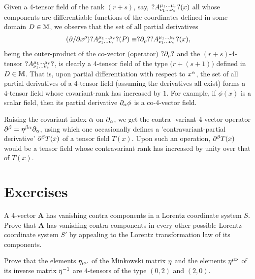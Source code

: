 Given a 4-tensor field of the rank 
$(r+s)$,  say, $?A^{{{\mu}_1}\dots {\ensuremath{{\mu}}_r}}_{{{\nu}_1}\dots 
{\ensuremath{{\nu}}_s}}?(x)$ all whose components are differentiable 
functions of the coordinates  defined in some domain $D\in 
\mathbb{M}$, we observe that the set of all partial derivatives
\begin{align*}
({\partial}/{\partial} 
x^{{\rho}})?A^{{{\mu}_1}\dots {\ensuremath{{\mu}}_r}}_{{{\nu}_1}\dots 
{\ensuremath{{\nu}}_s}}?(P)\equiv?{\partial}_{{\rho}}??A^{{{\mu}_1}\dots 
{\ensuremath{{\mu}}_r}}_{{{\nu}_1}\dots {\ensuremath{{\nu}}_s}}?(x),                     
\end{align*}
 being the outer-product of the co-vector (operator) 
$?{\partial}_{{\rho}}?$ and the $(r+s)$-4-tensor $?A^{{{\mu}_1}\dots 
{\ensuremath{{\mu}}_r}}_{{{\nu}_1}\dots {\ensuremath{{\nu}}_s}}?$,  is clearly a 4-tensor 
field of the type $\big(r+(s+1)\big)$ defined in $D\in 
\mathbb{M}$. That is, upon partial differentiation with respect 
to $x^{{\alpha}}$, the set of all partial derivatives of a 
4-tensor field (assuming the derivatives all exist) forms a 
4-tensor field whose covariant-rank has increased by $1$. 
For example, if $\phi(x)$ is a scalar field, then its 
partial derivative ${\partial}_{{\alpha}} \phi$  is a co-4-vector field.

Raising the covariant index ${\alpha}$ on ${\partial}_{{\alpha}}$, we get 
the contra  -variant-4-vector operator 
${\partial}^{{\beta}}={\eta}^{{\beta}{\alpha}}{\partial}_{{\alpha}}$, using which one 
occasionally defines a 'contravariant-partial derivative'  
${\partial}^{{\beta}} T(x)$ of a tensor field  $T(x)$. Upon such an 
operation, ${\partial}^{{\beta}} T(x)$ would be a tensor field whose 
contravariant rank has increased by unity over that of 
$T(x)$.

\vspace{-.3cm}

\section*{Exercises}

\vspace{-.2cm}

\exise A 4-vector $\mathbf{A}$ has vanishing contra 
components in a Lorentz coordinate system $S$. Prove that 
$\mathbf{A}$ has vanishing contra components in every other 
possible  Lorentz coordinate system $S'$ by appealing to the 
Lorentz transformation law of its components.

\exise Prove that the elements  ${\eta}_{{\mu}{\nu}}$ of the 
Minkowski matrix ${\eta}$ and the elements ${\eta}^{{\mu}{\nu}}$ 
of its inverse matrix $ {\eta}^{-1}$ are 4-tensors of the type 
$(0,2) $ and $(2,0)$.

